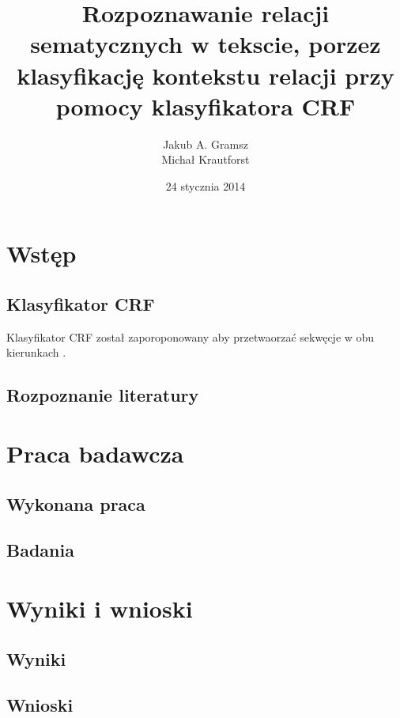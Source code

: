 \documentclass[a4paper,10pt]{report}
\title{Rozpoznawanie relacji sematycznych w tekscie, porzez klasyfikację kontekstu relacji przy pomocy klasyfikatora CRF}
\author{Jakub A. Gramsz \\ Michał Krautforst}
\date{24 stycznia 2014}
\begin{document}
\renewcommand{\figurename}{Wykres}
\renewcommand{\chaptername}{}

\maketitle
\tableofcontents

\chapter{Wstęp}

\section{Klasyfikator CRF}

Klasyfikator CRF został zaporoponowany aby przetwaorzać sekwęcje w obu kierunkach \cite{lafferty2001crf}.

\section{Rozpoznanie literatury}

\chapter{Praca badawcza}

\section{Wykonana praca}

\section{Badania}

\chapter{Wyniki i wnioski}

\section{Wyniki}

\section{Wnioski}


\nocite{*}

\end{document}
